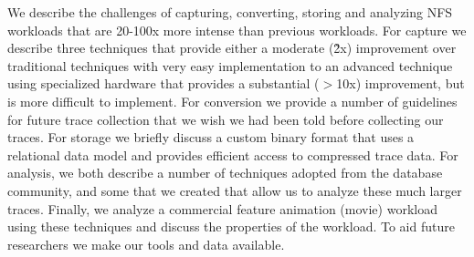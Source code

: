 We describe the challenges of capturing, converting, storing and
analyzing NFS workloads that are 20-100x more intense than previous
workloads.  For capture we describe three techniques that provide
either a moderate (\~2x) improvement over traditional techniques with
very easy implementation to an advanced technique using specialized
hardware that provides a substantial ($>$10x) improvement, but is more
difficult to implement.  For conversion we provide a number of
guidelines for future trace collection that we wish we had been told
before collecting our traces.  For storage we briefly discuss a custom
binary format that uses a relational data model and provides efficient
access to compressed trace data.  For analysis, we both describe a
number of techniques adopted from the database community, and some
that we created that allow us to analyze these much larger traces.
Finally, we analyze a commercial feature animation (movie) workload
using these techniques and discuss the properties of the workload.  To
aid future researchers we make our tools and data available.
